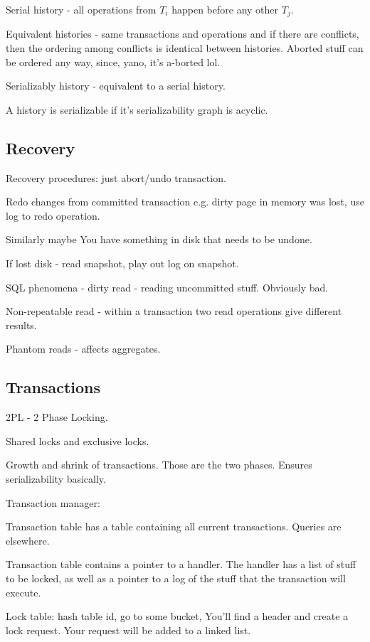 \documentclass{article}
\begin{document}
		Serial history - all operations from $T_i$ happen before any other $T_j$.
		
		Equivalent histories - same transactions and operations and if there are conflicts, then the ordering among conflicts is identical between histories. Aborted stuff can be ordered any way, since, yano, it's a-borted lol.
		
		Serializably history - equivalent to a serial history.
		
		A history is serializable if it's serializability graph is acyclic.
		
	\subsection{Recovery}
	
		Recovery procedures: just abort/undo transaction.
		
		Redo changes from committed transaction e.g. dirty page in memory was lost, use log to redo operation.
		
		Similarly maybe You have something in disk that needs to be undone.
		
		If lost disk - read snapshot, play out log on snapshot.
		
		SQL phenomena - dirty read - reading uncommitted stuff. Obviously bad.
		
		Non-repeatable read - within a transaction two read operations give different results.
		
		Phantom reads - affects aggregates. 
		
	\subsection{Transactions}
	
		2PL - 2 Phase Locking.
		
		Shared locks and exclusive locks.
		
		Growth and shrink of transactions. Those are the two phases. Ensures serializability basically.
		
		Transaction manager:
		
		Transaction table has a table containing all current transactions. Queries are elsewhere.
	
		Transaction table contains a pointer to a handler. The handler has a list of stuff to be locked, as well as a pointer to a log of the stuff that the transaction will execute.
		
		Lock table: hash table id, go to some bucket, You'll find a header and create a lock request. Your request will be added to a linked list. 
		
\end{document}
